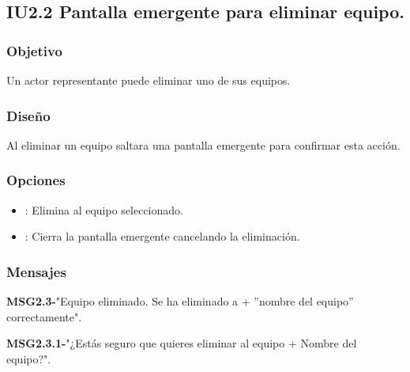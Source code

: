 
\subsection{IU2.2 Pantalla emergente para eliminar equipo.}

\subsubsection{Objetivo}
	Un actor representante puede eliminar uno de sus equipos.

\subsubsection{Diseño}
  Al eliminar un equipo saltara una pantalla emergente para confirmar esta acción.

\subsubsection{Opciones}
\begin{itemize}
  \item {}: Elimina al equipo seleccionado.
  \item {}: Cierra la pantalla emergente cancelando la eliminación.
\end{itemize}

\subsubsection{Mensajes}
	\begin{Citemize}
		\item {\bf MSG2.3-}"Equipo eliminado. Se ha eliminado a + ”nombre del equipo” correctamente".
				\item {\bf MSG2.3.1-}"¿Estás seguro que quieres eliminar al equipo + Nombre del equipo?".
	\end{Citemize}